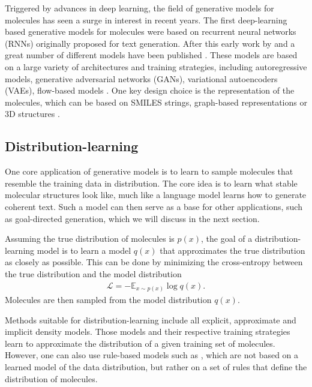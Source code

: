 Triggered by advances in deep learning, the field of generative models for
molecules has seen a surge in interest in recent years. The first deep-learning
based generative models for molecules were based on recurrent neural networks
(RNNs) originally proposed for text generation. After this early work by
\citep{seglerGeneratingFocusedMolecule2018} and
\citep{gomez-bombarelliAutomaticChemicalDesign2018} a great number of different
models have been published
\citep{eltonDeepLearningMolecular2019,sanchez-lengelingInverseMolecularDesign2018}.
These models are based on a large variety of architectures and training
strategies, including autoregressive models, generative adversarial networks
(GANs), variational autoencoders (VAEs), flow-based models
\citep{madhawaGraphNVPInvertibleFlow2019}. One key design choice is the
representation of the molecules, which can be based on SMILES strings,
graph-based representations or 3D structures
\citep{eltonDeepLearningMolecular2019,sanchez-lengelingInverseMolecularDesign2018,pangDeepGenerativeModels2024}.

\subsection{Distribution-learning}
One core application of generative models is to learn to sample molecules that
resemble the training data in distribution. The core idea is to learn what
stable molecular structures look like, much like a language model learns how to
generate coherent text. Such a model can then serve as a base for other
applications, such as goal-directed generation, which we will discuss in the next
section.

Assuming the true distribution of molecules is $p(x)$, the goal of a
distribution-learning model is to learn a model $q(x)$ that approximates the
true distribution as closely as possible. This can be done by minimizing the
cross-entropy between the true distribution and the model distribution
\begin{align}
    \mathcal{L} = - \mathbb{E}_{x \sim p(x)} \log q(x).
\end{align}
Molecules are then sampled from the model distribution $q(x)$. 

Methods suitable for distribution-learning include all explicit, approximate and 
implicit density models. Those models and their respective training strategies
learn to approximate the distribution of a given training set of molecules.
However, one can also use rule-based models such as \citep{jensenGraphbasedGeneticAlgorithm2019}, which are not based on a learned
model of the data distribution, but rather on a set of rules that define the
distribution of molecules.

